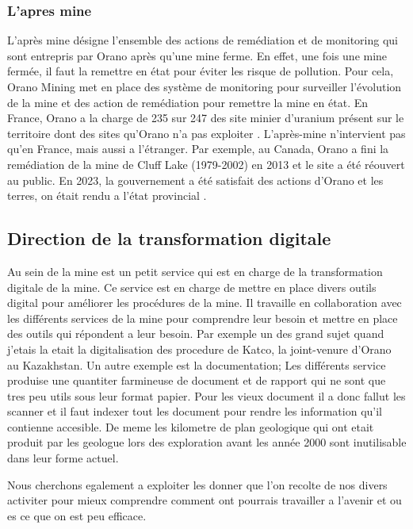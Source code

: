 \subsubsection{L'apres mine}
L'après mine désigne l'ensemble des actions de remédiation et de monitoring qui sont entrepris par Orano après qu'une mine ferme. En effet, une fois une mine fermée, il faut la remettre en état pour éviter les risque de pollution. Pour cela, Orano Mining met en place des système de monitoring pour surveiller l'évolution de la mine et des action de remédiation pour remettre la mine en état. En France, Orano a la charge de 235 sur 247 des site minier d'uranium présent sur le territoire dont des sites qu'Orano n'a pas exploiter \cite{site:orano_apres_mine}. L'après-mine n'intervient pas qu'en France, mais aussi a l'étranger. Par exemple, au Canada, Orano a fini la remédiation de la mine de Cluff Lake (1979-2002) en 2013 et le site a été réouvert au public. En 2023, la gouvernement a été satisfait des actions d'Orano et les terres, on était rendu a l'état provincial \cite{site:Cluff_lake_remediation}.

\subsection{Direction de la transformation digitale}
Au sein de la mine est un petit service qui est en charge de la transformation digitale de la mine. Ce service est en charge de mettre en place divers outils digital pour améliorer les procédures de la mine. Il travaille en collaboration avec les différents services de la mine pour comprendre leur besoin et mettre en place des outils qui répondent a leur besoin. Par exemple un des grand sujet quand j'etais la etait la digitalisation des procedure de Katco, la joint-venure d'Orano au Kazakhstan. Un autre exemple est la documentation; Les différents service produise une quantiter farmineuse de document et de rapport qui ne sont que tres peu utils sous leur format papier. Pour les vieux document il a donc fallut les scanner et il faut indexer tout les document pour rendre les information qu'il contienne accesible. De meme les kilometre de plan geologique qui ont etait produit par les geologue lors des exploration avant les année 2000 sont inutilisable dans leur forme actuel.

Nous cherchons egalement a exploiter les donner que l'on recolte de nos divers activiter pour mieux comprendre comment ont pourrais travailler a l'avenir et ou es ce que on est peu efficace.

